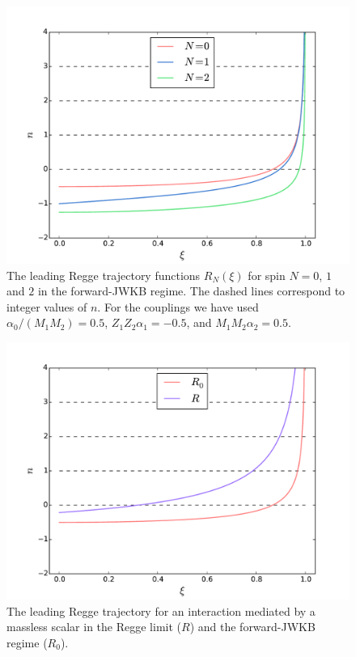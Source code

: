 \begin{figure}
\centering
\includegraphics[scale=0.56]{figures/012.pdf}
\caption{The leading Regge trajectory functions $R_{N}(\xi)$ for spin $N = 0$, $1$ and $2$ in the forward-JWKB regime. The dashed lines correspond to integer values of $n$. For the couplings we have used $\alpha_{0} / (M_{1} M_{2}) = 0.5$, $Z_{1} Z_{2} \alpha_{1} = -0.5$, and $M_{1} M_{2} \alpha_{2} = 0.5$.}
\label{fig012}
\end{figure}

\begin{figure}
\centering
\includegraphics[scale=0.56]{figures/R0R.pdf}
\caption{The leading Regge trajectory for an interaction mediated by a massless scalar in the Regge limit ($R$) and the forward-JWKB regime ($R_{0}$).}
\label{figR0R}
\end{figure}

